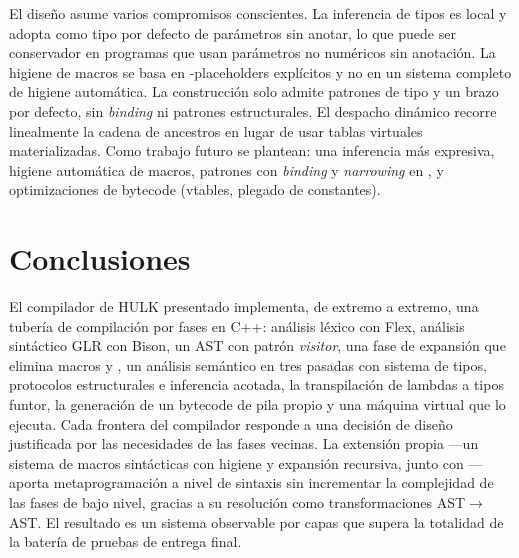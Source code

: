 \documentclass[12pt,letterpaper]{article}
\newcommand{\repo}[1]{\texttt{\detokenize{#1}}}
\newcommand{\hulk}{\textsc{HULK}}
\begin{document}
El diseño asume varios compromisos conscientes. La inferencia de tipos es local y
adopta \repo{Number} como tipo por defecto de parámetros sin anotar, lo que puede
ser conservador en programas que usan parámetros no numéricos sin anotación. La
higiene de macros se basa en \repo{$}-placeholders explícitos y no en un sistema
completo de higiene automática. La construcción \repo{match} solo admite patrones de
tipo y un brazo por defecto, sin \emph{binding} ni patrones estructurales. El
despacho dinámico recorre linealmente la cadena de ancestros en lugar de usar tablas
virtuales materializadas. Como trabajo futuro se plantean: una inferencia más
expresiva, higiene automática de macros, patrones con \emph{binding} y
\emph{narrowing} en \repo{match}, y optimizaciones de bytecode (vtables, plegado de
constantes).

\section{Conclusiones}

El compilador de \hulk{} presentado implementa, de extremo a extremo, una tubería de
compilación por fases en C++: análisis léxico con Flex, análisis sintáctico GLR con
Bison, un AST con patrón \emph{visitor}, una fase de expansión que elimina macros y
\repo{match}, un análisis semántico en tres pasadas con sistema de tipos, protocolos
estructurales e inferencia acotada, la transpilación de lambdas a tipos funtor, la
generación de un bytecode de pila propio y una máquina virtual que lo ejecuta. Cada
frontera del compilador responde a una decisión de diseño justificada por las
necesidades de las fases vecinas. La extensión propia ---un sistema de macros
sintácticas con higiene y expansión recursiva, junto con \repo{match}--- aporta
metaprogramación a nivel de sintaxis sin incrementar la complejidad de las fases de
bajo nivel, gracias a su resolución como transformaciones AST$\to$AST. El resultado
es un sistema observable por capas que supera la totalidad de la batería de pruebas
de entrega final.
\end{document}
